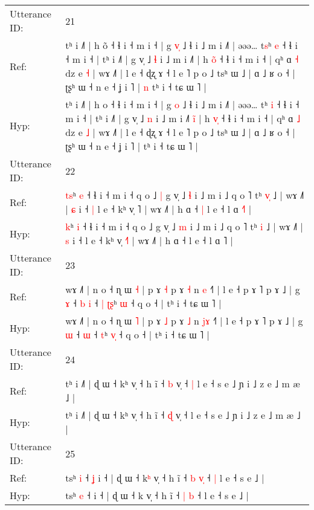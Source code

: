 \documentclass[10pt]{article}
\DeclareRobustCommand{\hl}[1]{{\textcolor{red}{#1}}}
\begin{document}
\begin{longtable}{ll}
 \\
\midrule
Utterance ID: & 21 \\
Ref: & tʰ i ˩˥ | h o\hl{̃} ˧ ɬ i ˧ m i ˧ | g \hl{v}\hl{̩} ˩ ɬ i ˩ m i ˩˥ | əəə… t\hl{s}ʰ \hl{e} ˧ ɬ i ˧ m i ˧ | tʰ i ˩˥ | g v̩ ˩ \hl{ɬ} i ˩ m i ˩˥\hl{}\hl{}\hl{} | h \hl{o}\hl{̃} ˧ ɬ i ˧ m i ˧ | qʰ ɑ \hl{˧} dz e \hl{˧} | wɤ ˩˥ | l e ˧ ɖʐ ɤ ˧ l e ˥ p o ˩ tsʰ ɯ ˩ | ɑ ˩ ʁ o ˧ | ʈʂʰ ɯ ˧ n e ˧ ʝ i ˥ |\hl{ }\hl{n} tʰ i ˧ tɕ ɯ ˥ |
 \\
Hyp: & tʰ i ˩˥ | h o\hl{} ˧ ɬ i ˧ m i ˧ | g \hl{}\hl{o} ˩ ɬ i ˩ m i ˩˥ | əəə… t\hl{}ʰ \hl{i} ˧ ɬ i ˧ m i ˧ | tʰ i ˩˥ | g v̩ ˩ \hl{n} i ˩ m i ˩˥\hl{ }\hl{i}\hl{̃} | h \hl{v}\hl{̩} ˧ ɬ i ˧ m i ˧ | qʰ ɑ \hl{˩} dz e \hl{˩} | wɤ ˩˥ | l e ˧ ɖʐ ɤ ˧ l e ˥ p o ˩ tsʰ ɯ ˩ | ɑ ˩ ʁ o ˧ | ʈʂʰ ɯ ˧ n e ˧ ʝ i ˥ |\hl{}\hl{} tʰ i ˧ tɕ ɯ ˥ |
 \\
\midrule
Utterance ID: & 22 \\
Ref: & \hl{t}\hl{s}ʰ \hl{e} ˧ ɬ i ˧ m i ˧ q o ˩\hl{ }\hl{|} g v̩ ˩ \hl{ɬ} i ˩ m i ˩ q o ˥ tʰ \hl{v}\hl{̩} ˩ | wɤ ˩˥ | \hl{ɕ} i ˧\hl{ }\hl{|} l e ˧ kʰ v̩ \hl{}˥ | wɤ ˩˥ | h ɑ ˧\hl{ }\hl{|} l e ˧ l ɑ \hl{˧}˥ |
 \\
Hyp: & \hl{}\hl{k}ʰ \hl{i} ˧ ɬ i ˧ m i ˧ q o ˩\hl{}\hl{} g v̩ ˩ \hl{m} i ˩ m i ˩ q o ˥ tʰ \hl{}\hl{i} ˩ | wɤ ˩˥ | \hl{s} i ˧\hl{}\hl{} l e ˧ kʰ v̩ \hl{˧}˥ | wɤ ˩˥ | h ɑ ˧\hl{}\hl{} l e ˧ l ɑ \hl{}˥ |
 \\
\midrule
Utterance ID: & 23 \\
Ref: & wɤ ˩˥ | n o ˧ ɳ ɯ \hl{˧} | p ɤ \hl{˧} p ɤ \hl{˧} n \hl{}\hl{e} ˧˥ | l e ˧ p ɤ ˥ p ɤ ˩ | g \hl{ɤ} ˧\hl{ }\hl{b} \hl{i} ˧\hl{ }\hl{|} \hl{ʈ}\hl{ʂ}ʰ \hl{}\hl{ɯ} ˧ q o ˧ | tʰ i ˧ tɕ ɯ ˥ |
 \\
Hyp: & wɤ ˩˥ | n o ˧ ɳ ɯ \hl{˥} | p ɤ \hl{˩} p ɤ \hl{˩} n \hl{j}\hl{ɤ} ˧˥ | l e ˧ p ɤ ˥ p ɤ ˩ | g \hl{ɯ} ˧\hl{}\hl{} \hl{ɯ} ˧\hl{}\hl{} \hl{}\hl{t}ʰ \hl{v}\hl{̩} ˧ q o ˧ | tʰ i ˧ tɕ ɯ ˥ |
 \\
\midrule
Utterance ID: & 24 \\
Ref: & tʰ i ˩˥ | ɖ ɯ ˧ kʰ v̩ ˧ h ĩ ˧ \hl{b} v̩ ˧\hl{ }\hl{|} l e ˧ s e ˩ ɲ i ˩ z e ˩ m æ ˩ |
 \\
Hyp: & tʰ i ˩˥ | ɖ ɯ ˧ kʰ v̩ ˧ h ĩ ˧ \hl{ɖ} v̩ ˧\hl{}\hl{} l e ˧ s e ˩ ɲ i ˩ z e ˩ m æ ˩ |
 \\
\midrule
Utterance ID: & 25 \\
Ref: & tsʰ \hl{i} ˧\hl{ }\hl{ʝ} i ˧ | ɖ ɯ ˧ k\hl{ʰ} v̩ ˧ h ĩ ˧ \hl{b} \hl{v}\hl{̩} ˧\hl{ }\hl{|} l e ˧ s e ˩ |
 \\
Hyp: & tsʰ \hl{e} ˧\hl{}\hl{} i ˧ | ɖ ɯ ˧ k\hl{} v̩ ˧ h ĩ ˧ \hl{|} \hl{}\hl{b} ˧\hl{}\hl{} l e ˧ s e ˩ |

\end{longtable}
\end{document}
